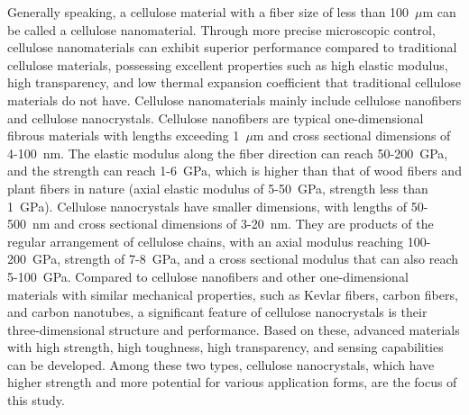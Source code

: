 \documentclass{article}
\begin{document}
Generally speaking, a cellulose material with a fiber size of less than 100~$\mu$m can be called a cellulose nanomaterial\cite{liu2022cellulose}.
Through more precise microscopic control, cellulose nanomaterials can exhibit superior performance compared to traditional cellulose materials, possessing excellent properties such as high elastic modulus\cite{moon2011cellulose,nishiyama2009structure}, high transparency\cite{zhu2013transparent}, and low thermal expansion coefficient\cite{okahisa2009optically} that traditional cellulose materials do not have\cite{liu2022cellulose,huang2024flexible}.
Cellulose nanomaterials mainly include cellulose nanofibers\cite{liu2022cellulose} and cellulose nanocrystals\cite{kim2015review,rana2021cellulose}.
Cellulose nanofibers are typical one-dimensional fibrous materials with lengths exceeding 1~$\mu$m and cross sectional dimensions of 4-100~nm.
The elastic modulus along the fiber direction can reach 50-200~GPa, and the strength can reach 1-6~GPa, which is higher than that of wood fibers and plant fibers in nature (axial elastic modulus of 5-50~GPa, strength less than 1~GPa)\cite{moon2016overview}.
Cellulose nanocrystals have smaller dimensions, with lengths of 50-500~nm and cross sectional dimensions of 3-20~nm.
They are products of the regular arrangement of cellulose chains, with an axial modulus reaching 100-200~GPa, strength of 7-8~GPa, and a cross sectional modulus that can also reach 5-100~GPa\cite{moon2016overview}.
Compared to cellulose nanofibers and other one-dimensional materials with similar mechanical properties, such as Kevlar fibers, carbon fibers, and carbon nanotubes\cite{moon2011cellulose}, a significant feature of cellulose nanocrystals is their three-dimensional structure and performance.
Based on these, advanced materials with high strength, high toughness\cite{chen2020exploring}, high transparency\cite{cebrian2022development}, and sensing capabilities\cite{teodoro2021review} can be developed.
Among these two types, cellulose nanocrystals, which have higher strength and more potential for various application forms\cite{shojaeiarani2021cellulose}, are the focus of this study.
\end{document}
